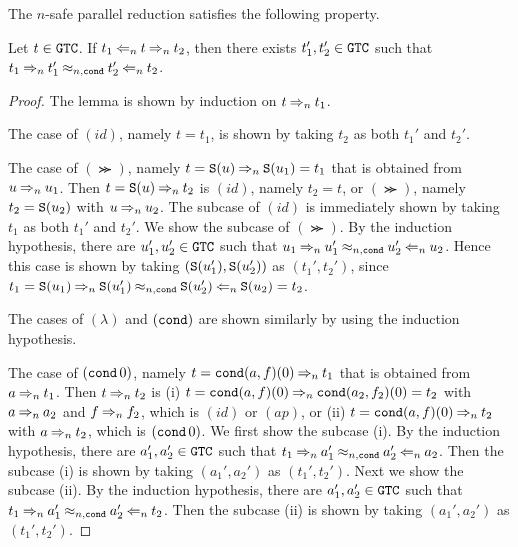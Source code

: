 The $n$-safe parallel reduction satisfies the following  property. 
\begin{lemma}\label{lem:parallel_pentagon}
  Let $t \in {\tt GTC}$.
  If $t_1 \mathbin{\Leftarrow_{n}} t \mathbin{\Rightarrow_{n}} t_2$,
  then there exists $t_1',t_2'\in {\tt GTC}$ such that $t_1 \mathbin{\Rightarrow_{n}} t_1' \mathbin{\approx_{n,{\tt cond}}} t_2' \mathbin{\Leftarrow_{n}} t_2$.
\end{lemma}
\begin{proof}
  The lemma is shown by induction on $t \mathbin{\Rightarrow_{n}} t_1$. 

  The case of $(id)$, namely $t=t_1$, is shown by taking $t_2$ as both $t_1'$ and $t_2'$. 
  
  The case of $(\Succ)$, namely $t={\tt S}(u) \mathbin{\Rightarrow_{n}} {\tt S}(u_1)=t_1$ that is obtained
  from $u \mathbin{\Rightarrow_{n}} u_1$.
  Then $t={\tt S}(u) \mathbin{\Rightarrow_{n}} t_2$ is $(id)$, namely $t_2 = t$, or 
  $(\Succ)$, namely $t_2={\tt S}(u_2)$ with $u \mathbin{\Rightarrow_{n}} u_2$.
  The subcase of $(id)$ is immediately shown by taking $t_1$ as both $t_1'$ and $t_2'$. 
  We show the subcase of $(\Succ)$.
  By the induction hypothesis, there are $u_1', u_2' \in {\tt GTC}$ such that
  $u_1 \mathbin{\Rightarrow_{n}} u_1' \mathbin{\approx_{n,{\tt cond}}} u_2' \mathbin{\Leftarrow_{n}} u_2$.
  Hence this case is shown by taking $({\tt S}(u_1'),{\tt S}(u_2'))$ as $(t_1',t_2')$, 
  since $t_1 = {\tt S}(u_1) \mathbin{\Rightarrow_{n}} {\tt S}(u_1') \mathbin{\approx_{n,{\tt cond}}} {\tt S}(u_2') \mathbin{\Leftarrow_{n}} {\tt S}(u_2) = t_2$.
  
  The cases of $(\lambda)$ and $({\tt cond})$ are shown similarly by using the induction hypothesis.  

  The case of $({\tt cond}\,0)$, namely $t = {\tt cond}(a,f)(0) \mathbin{\Rightarrow_{n}} t_1$ that is
  obtained from $a \mathbin{\Rightarrow_{n}} t_1$.
  Then $t \mathbin{\Rightarrow_{n}} t_2$ is
  (i) $t={\tt cond}(a,f)(0) \mathbin{\Rightarrow_{n}} {\tt cond}(a_2,f_2)(0) = t_2$
  with $a \mathbin{\Rightarrow_{n}} a_2$ and $f \mathbin{\Rightarrow_{n}} f_2$, which is $(id)$ or $(ap)$, or
  (ii) $t={\tt cond}(a,f)(0) \mathbin{\Rightarrow_{n}} t_2$ with $a \mathbin{\Rightarrow_{n}} t_2$, which is $({\tt cond}\,0)$. 
  We first show the subcase (i).
  By the induction hypothesis, there are $a_1', a_2' \in {\tt GTC}$ such that
  $t_1 \mathbin{\Rightarrow_{n}} a_1' \mathbin{\approx_{n,{\tt cond}}} a_2' \mathbin{\Leftarrow_{n}} a_2$.
  Then the subcase (i) is shown by taking $(a_1',a_2')$ as $(t_1',t_2')$. 
  Next we show the subcase (ii). 
  By the induction hypothesis, there are $a_1', a_2' \in {\tt GTC}$ such that
  $t_1 \mathbin{\Rightarrow_{n}} a_1' \mathbin{\approx_{n,{\tt cond}}} a_2' \mathbin{\Leftarrow_{n}} t_2$.
  Then the subcase (ii) is shown by taking $(a_1',a_2')$ as $(t_1',t_2')$. 


\end{proof}
